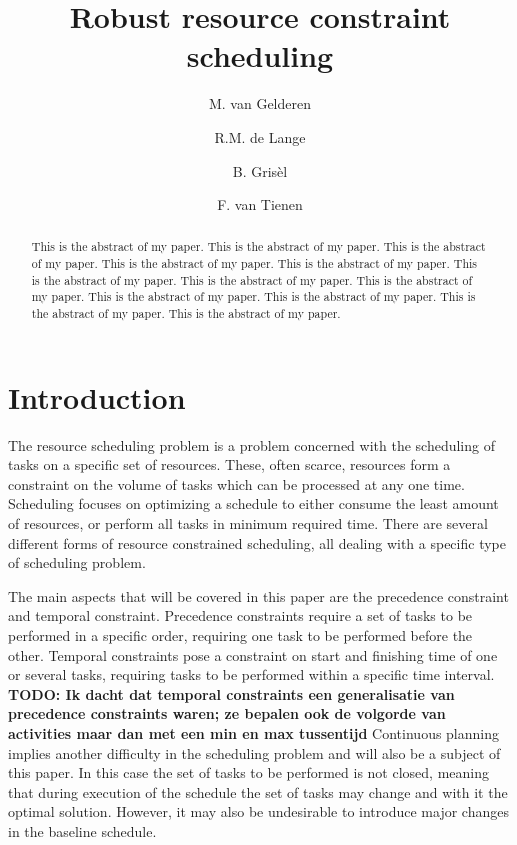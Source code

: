 \documentclass{article}
\title{Robust resource constraint scheduling}
\author{M. van Gelderen  \and
    R.M. de Lange \and
    B. Gris\`el \and
    F. van Tienen}
\newcommand{\TODO}[1]{{\color{red}\textbf{TODO: #1}}}
\begin{document}
\maketitle
\thispagestyle{empty}

\begin{abstract}
This is the abstract of my paper.
This is the abstract of my paper.
This is the abstract of my paper.
This is the abstract of my paper.
This is the abstract of my paper.
This is the abstract of my paper.
This is the abstract of my paper.
This is the abstract of my paper.
This is the abstract of my paper.
This is the abstract of my paper.
This is the abstract of my paper.
This is the abstract of my paper.
\end{abstract}


\section{Introduction}


The resource scheduling problem is a problem concerned with the scheduling of tasks on a specific set of resources. These, often scarce, resources form a constraint on the volume of tasks which can be processed at any one time. Scheduling focuses on optimizing a schedule to either consume the least amount of resources, or perform all tasks in minimum required time. There are several different forms of resource constrained scheduling, all dealing with a specific type of scheduling problem.

The main aspects that will be covered in this paper are the precedence constraint and temporal constraint. Precedence constraints require a set of tasks to be performed in a specific order, requiring one task to be performed before the other. Temporal constraints pose a constraint on start and finishing time of one or several tasks, requiring tasks to be performed within a specific time interval. \TODO{Ik dacht dat temporal constraints een generalisatie van precedence constraints waren; ze bepalen ook de volgorde van activities maar dan met een min en max tussentijd} Continuous planning implies another difficulty in the scheduling problem and will also be a subject of this paper. In this case the set of tasks to be performed is not closed, meaning that during execution of the schedule the set of tasks may change and with it the optimal solution. However, it may also be undesirable to introduce major changes in the baseline schedule.
\end{document}
